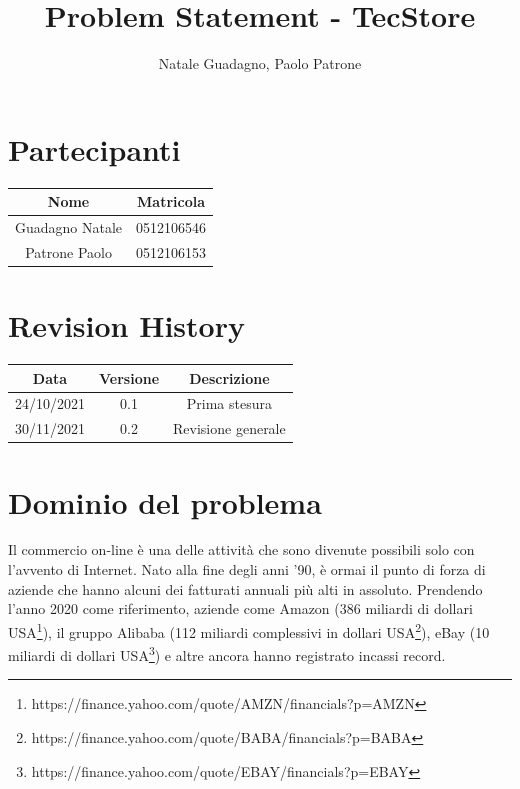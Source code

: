 \documentclass[12pt,a4paper]{article}
\author{Natale Guadagno, Paolo Patrone}
\title{Problem Statement - TecStore}
\begin{document}
\maketitle
\newpage
\tableofcontents
\newpage

\section*{Partecipanti}
\begin{center}
\begin{tabular} {|c|c|}
\hline
\textbf{Nome} & \textbf{Matricola} \\
\hline
Guadagno Natale & 0512106546 \\
Patrone Paolo & 0512106153 \\
\hline
\end{tabular}
\end{center}


\section*{Revision History}
\begin{center}
\begin{tabular} {|c|c|c|}
\hline
\textbf{Data} & \textbf{Versione} & \textbf{Descrizione} \\
\hline
24/10/2021 & 0.1 & Prima stesura \\
30/11/2021 & 0.2 & Revisione generale \\
\hline
\end{tabular}
\end{center}

\newpage

\section{Dominio del problema}
Il commercio on-line è una delle attività che sono divenute possibili solo con l'avvento di Internet. Nato alla fine degli anni '90, è ormai il punto di forza di aziende che hanno alcuni dei fatturati annuali più alti in assoluto. Prendendo l'anno 2020 come riferimento, aziende come Amazon (386 miliardi di dollari USA\footnote{https://finance.yahoo.com/quote/AMZN/financials?p=AMZN}), il gruppo Alibaba (112 miliardi complessivi in dollari USA\footnote{https://finance.yahoo.com/quote/BABA/financials?p=BABA}), eBay (10 miliardi di dollari USA\footnote{https://finance.yahoo.com/quote/EBAY/financials?p=EBAY}) e altre ancora hanno registrato incassi record.
\end{document}

